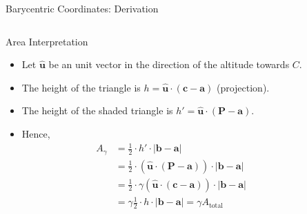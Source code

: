 \begin{frame}{Barycentric Coordinates: Derivation}
    \begin{columns}
        \begin{column}{0.65\textwidth}
            \begin{mathbox}{Area Interpretation}
                \begin{itemize}
                    \small
                    \item  Let $\hat{\mathbf{u}}$ be an unit vector in the direction of the altitude towards $C$. 
                    \pause
                    \item  The height of the triangle is $h = \hat{\mathbf{u}} \cdot (\mathbf{c} - \mathbf{a})$ (projection).
                    \pause
                    \item  The height of the shaded triangle is $h' = \hat{\mathbf{u}} \cdot (\mathbf{P} - \mathbf{a})$.
                    \pause
                    \item  Hence, \begin{align*}
                        A_{\gamma} &= \frac{1}{2} \cdot h' \cdot |\mathbf{b} - \mathbf{a}| \\
                        &= \frac{1}{2} \cdot \left (\hat{\mathbf{u}} \cdot (\mathbf{P} - \mathbf{a}) \right ) \cdot |\mathbf{b} - \mathbf{a}|  \\
                        &= \frac{1}{2} \cdot \gamma \left (\hat{\mathbf{u}} \cdot (\mathbf{c} - \mathbf{a}) \right ) \cdot |\mathbf{b} - \mathbf{a}|  \\
                        &= \gamma \frac{1}{2} \cdot h \cdot |\mathbf{b} - \mathbf{a}| = \gamma A_{\text{total}}
                    \end{align*}
                \end{itemize}
            \end{mathbox}    
        \end{column}
        \begin{column}{0.35\textwidth}
\end{column}
\end{columns}
\end{frame}
